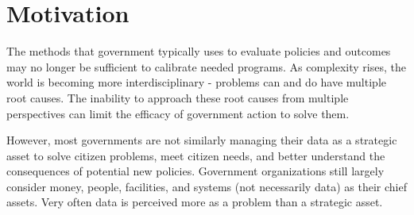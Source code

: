 \noindent{}


\section[Motivation]{\textbf{Motivation}}
The methods that government typically uses to
evaluate policies and outcomes may no longer be
sufficient to calibrate needed programs. As
complexity rises, the world is becoming more
interdisciplinary - problems can and do have
multiple root causes. The inability to approach
these root causes from multiple perspectives can
limit the efficacy of government action to solve
them.

However, most governments are not similarly managing
their data as a strategic asset to solve citizen problems,
meet citizen needs, and better understand the
consequences of potential new policies. Government
organizations still largely consider money, people,
facilities, and systems (not necessarily data) as their chief
assets. Very often data is perceived more as a problem
than a strategic asset.



